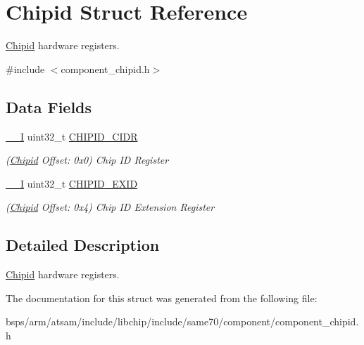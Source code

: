 \hypertarget{structChipid}{}\section{Chipid Struct Reference}
\label{structChipid}


\mbox{\hyperlink{structChipid}{Chipid}} hardware registers.  




{\ttfamily \#include $<$component\+\_\+chipid.\+h$>$}

\subsection*{Data Fields}
\begin{DoxyCompactItemize}
\item 
\mbox{\label{structChipid_a341b19de4d89ed469e5923905935ec18}} 
\mbox{\hyperlink{core__cm7_8h_af63697ed9952cc71e1225efe205f6cd3}{\+\_\+\+\_\+I}} uint32\+\_\+t \mbox{\hyperlink{structChipid_a341b19de4d89ed469e5923905935ec18}{C\+H\+I\+P\+I\+D\+\_\+\+C\+I\+DR}}
\begin{DoxyCompactList}\small\item\em (\mbox{\hyperlink{structChipid}{Chipid}} Offset\+: 0x0) Chip ID Register \end{DoxyCompactList}\item 
\mbox{\label{structChipid_a2a3e676c8eb57a9c77f7029f40a8ea4f}} 
\mbox{\hyperlink{core__cm7_8h_af63697ed9952cc71e1225efe205f6cd3}{\+\_\+\+\_\+I}} uint32\+\_\+t \mbox{\hyperlink{structChipid_a2a3e676c8eb57a9c77f7029f40a8ea4f}{C\+H\+I\+P\+I\+D\+\_\+\+E\+X\+ID}}
\begin{DoxyCompactList}\small\item\em (\mbox{\hyperlink{structChipid}{Chipid}} Offset\+: 0x4) Chip ID Extension Register \end{DoxyCompactList}\end{DoxyCompactItemize}


\subsection{Detailed Description}
\mbox{\hyperlink{structChipid}{Chipid}} hardware registers. 

The documentation for this struct was generated from the following file\+:\begin{DoxyCompactItemize}
\item 
bsps/arm/atsam/include/libchip/include/same70/component/component\+\_\+chipid.\+h\end{DoxyCompactItemize}
